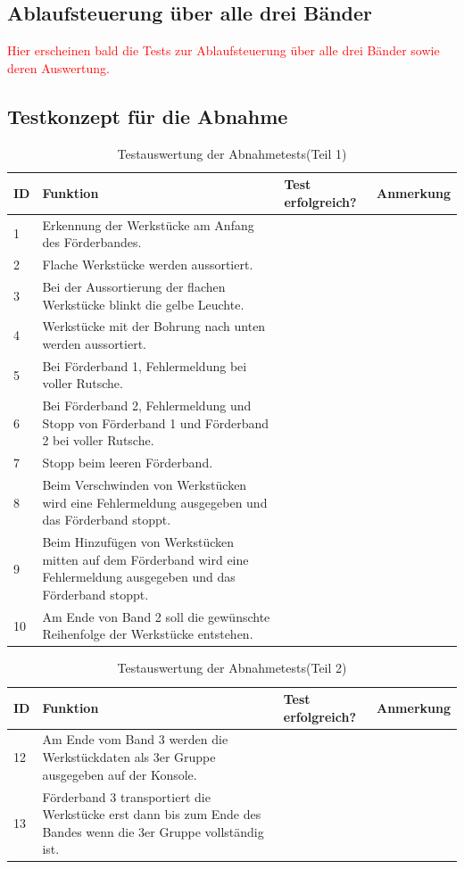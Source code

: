 \documentclass[a4paper, 11pt]{article}
\begin{document}
\subsection{Ablaufsteuerung über alle drei Bänder}
\textcolor{red}{Hier erscheinen bald die Tests zur Ablaufsteuerung über alle drei Bänder sowie deren Auswertung.}

\subsection{Testkonzept für die Abnahme} 
\begin{table}[h]
\center
\begin{tabularx}{\textwidth}{|l|X|X|X|}
\hline
\textbf{ID}&\textbf{Funktion}&\textbf{Test erfolgreich?}&\textbf{Anmerkung}\\
\hline
1&Erkennung der Werkstücke am Anfang des Förderbandes.&&\\
\hline
2&Flache Werkstücke werden aussortiert.&&\\
\hline
3&Bei der Aussortierung der flachen Werkstücke blinkt die gelbe Leuchte.&&\\
\hline
4&Werkstücke mit der Bohrung nach unten werden aussortiert.&&\\
\hline
5&Bei Förderband 1, Fehlermeldung bei voller Rutsche.&&\\
\hline
6&Bei Förderband 2, Fehlermeldung und Stopp von Förderband 1 und Förderband 2 bei voller Rutsche.&&\\
\hline
7&Stopp beim leeren Förderband.&&\\
\hline
8&Beim Verschwinden von Werkstücken wird eine Fehlermeldung ausgegeben und das Förderband stoppt.&&\\
\hline
9&Beim Hinzufügen von Werkstücken mitten auf dem Förderband wird eine Fehlermeldung ausgegeben und das Förderband stoppt.&&\\
\hline
10&Am Ende von Band 2 soll die gewünschte Reihenfolge der Werkstücke entstehen.&&\\
\hline
\end{tabularx}
\caption{Testauswertung der Abnahmetests(Teil 1)}
\label{tstl1}
\end{table}

\newpage

\begin{table}[h]
\center
\begin{tabularx}{\textwidth}{|l|X|X|X|}
\hline
\textbf{ID}&\textbf{Funktion}&\textbf{Test erfolgreich?}&\textbf{Anmerkung}\\
\hline

12&Am Ende vom Band 3 werden die Werkstückdaten als 3er Gruppe ausgegeben auf der Konsole.&&\\
\hline
13&Förderband 3 transportiert die Werkstücke erst dann bis zum Ende des Bandes wenn die 3er Gruppe vollständig ist.&&\\
\hline
\end{tabularx}
\caption{Testauswertung der Abnahmetests(Teil 2)}
\label{tstl2}
\end{table}
\end{document}
